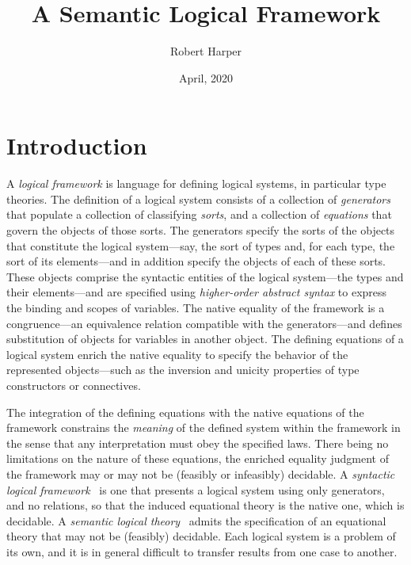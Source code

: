 \documentclass[11pt,twoside]{article}
\begin{document}
\title{A Semantic Logical Framework}
\author{Robert Harper}
\date{April, 2020}

\maketitle{}

\section{Introduction}

A \emph{logical framework} is language for defining logical systems, in particular type
theories.  The definition of a logical system consists of a collection of
\emph{generators} that populate a collection of classifying \emph{sorts}, and a collection
of \emph{equations} that govern the objects of those sorts.  The generators specify the
sorts of the objects that constitute the logical system---say, the sort of types and, for
each type, the sort of its elements---and in addition specify the objects of each of these
sorts.  These objects comprise the syntactic entities of the logical system---the types
and their elements---and are specified using \emph{higher-order abstract syntax} to
express the binding and scopes of variables.  The native equality of the framework is a
congruence---an equivalence relation compatible with the generators---and defines
substitution of objects for variables in another object.  The defining equations of a
logical system enrich the native equality to specify the behavior of the represented
objects---such as the inversion and unicity properties of type constructors or
connectives.

The integration of the defining equations with the native equations of the framework
constrains the \emph{meaning} of the defined system within the framework in the sense that
any interpretation must obey the specified laws.  There being no limitations on the nature
of these equations, the enriched equality judgment of the framework may or may not be
(feasibly or infeasibly) decidable.  A \emph{syntactic logical
  framework}~\cite{harper-etal:lf} is one that presents a logical system using only
generators, and no relations, so that the induced equational theory is the native one,
which is decidable.  A \emph{semantic logical theory}~\cite{smith1990programming} admits
the specification of an equational theory that may not be (feasibly) decidable.  Each
logical system is a problem of its own, and it is in general difficult to transfer results
from one case to another.
\end{document}
